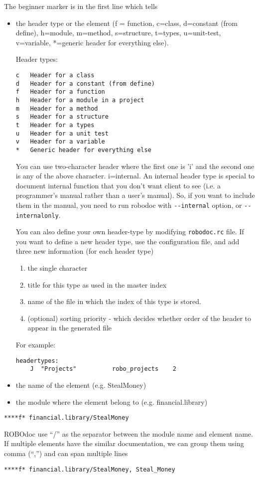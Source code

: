 The beginner marker is in the
first line which tells
\begin{itemize}
\item the header type or the element (f = function, c=class, d=constant (from
define), h=module, m=method, s=structure, t=types, u=unit-test, v=variable,
*=generic header for everything else).

Header types:
\begin{verbatim}
c	Header for a class
d	Header for a constant (from define)
f	Header for a function
h	Header for a module in a project
m	Header for a method
s	Header for a structure
t	Header for a types
u	Header for a unit test
v	Header for a variable
*	Generic header for everything else
\end{verbatim}

You can use two-character header where the first one is 'i' and the second one
is any of the above character. i=internal. An internal header type is special to
document internal function that you don't want client to see (i.e. a
programmer's manual rather than a user's manual). So, if you want to include
them in the manual, you need to run robodoc with \verb!--internal! option, or
\verb!--internalonly!.

You can also define your own header-type by modifying \verb!robodoc.rc! file.
If you want to define a new header type, use the configuration file,
and add three new information (for each header type) 
\begin{enumerate}
\item the single character
\item title for this type as used in the master index
\item name of the file in which the index of this type is stored. 
\item (optional) sorting priority - which decides whether order of the
  header to appear in the generated file
\end{enumerate}
For example:
\begin{verbatim}
headertypes:
    J  "Projects"          robo_projects    2
\end{verbatim}

\item the name of the element (e.g. StealMoney)
\item the module where the element belong to (e.g. financial.library)
\end{itemize}
\begin{verbatim}
****f* financial.library/StealMoney  
\end{verbatim}
ROBOdoc use ``/'' as the separator between the module name and element
name. If multiple elements have the similar documentation, we can
group them using comma (``,'') and can span multiple lines
\begin{verbatim}
****f* financial.library/StealMoney, Steal_Money
\end{verbatim}

